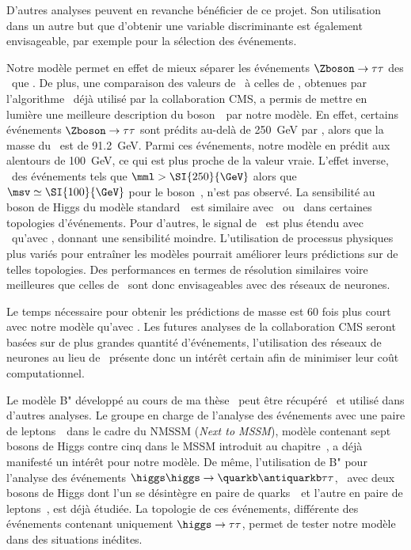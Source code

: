 D'autres analyses peuvent en revanche bénéficier de ce projet.
Son utilisation dans un autre but que d'obtenir une variable discriminante est également envisageable,
par exemple pour la sélection des événements.
\par
Notre modèle permet en effet de mieux séparer les événements $\Zboson\to\tau\tau$ des \ftauhs\ que \mTtot.
De plus, une comparaison des valeurs de \mml\ à celles de \msv, obtenues par l'algorithme \SVFIT\ déjà utilisé par la collaboration CMS,
a permis de mettre en lumière une meilleure description du boson~\Zboson\ par notre modèle.
En effet, certains événements $\Zboson\to\tau\tau$ sont prédits au-delà de \SI{250}{\GeV} par \SVFIT,
alors que la masse du \Zboson\ est de \SI{91.2}{\GeV}.
Parmi ces événements, notre modèle en prédit aux alentours de \SI{100}{\GeV}, ce qui est plus proche de la valeur vraie.
L'effet inverse,
\ie\ des événements tels que $\mml>\SI{250}{\GeV}$ alors que $\msv\simeq\SI{100}{\GeV}$ pour le boson~\Zboson,
n'est pas observé.
La sensibilité au boson de Higgs du modèle standard~\higgs\ est similaire avec \msv\ ou \mml\ dans certaines topologies d'événements.
Pour d'autres, le signal de \higgs\ est plus étendu avec \mml\ qu'avec \msv, donnant une sensibilité moindre.
L'utilisation de processus physiques plus variés pour entraîner les modèles pourrait améliorer leurs prédictions sur de telles topologies.
Des performances en termes de résolution similaires voire meilleures que celles de \SVFIT\ sont donc envisageables avec des réseaux de neurones.
\par
Le temps nécessaire pour obtenir les prédictions de masse est 60 fois plus court avec notre modèle qu'avec \SVFIT.
Les futures analyses de la collaboration CMS seront basées sur de plus grandes quantité d'événements,
l'utilisation des réseaux de neurones au lieu de \SVFIT\ présente donc un intérêt certain afin de minimiser leur coût computationnel.
\par
Le modèle B" développé au cours de ma thèse~\cite{DL_for_HTT_mass} peut être récupéré~\cite{DiTau_ML_mass} et utilisé dans d'autres analyses.
Le groupe en charge de
l'analyse des événements avec une paire de leptons~\tau\ dans le cadre du NMSSM (\emph{Next to MSSM}),
modèle contenant sept bosons de Higgs contre cinq dans le MSSM introduit au chapitre~,
a déjà manifesté un intérêt pour notre modèle.
De même,
l'utilisation de B" pour l'analyse des événements $\higgs\higgs\to\quarkb\antiquarkb\tau\tau$,
\ie\
avec deux bosons de Higgs dont l'un se désintègre en paire de quarks~\quarkb\
et l'autre en paire de leptons~\tau,
est déjà étudiée.
La topologie de ces événements, différente des événements contenant uniquement $\higgs\to\tau\tau$, permet de tester notre modèle dans des situations inédites.
